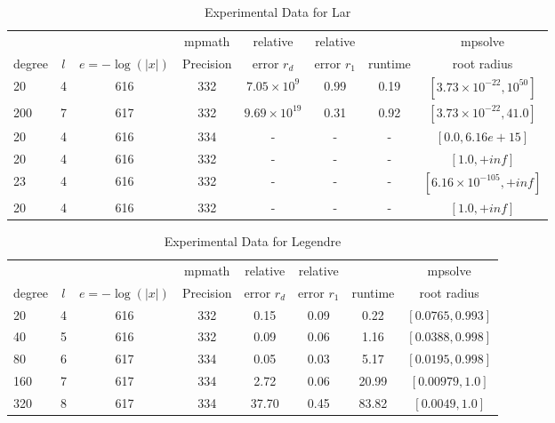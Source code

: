 \documentclass[sigconf]{acmart}
\begin{document}
\begin{table}[t]
\caption{Experimental Data for Lar}
\label{tab:lar}
\vskip -0.15in
\begin{center}
\begin{small}
\begin{sc}
\begin{tabular}{lccccccc}
\toprule
&  &  & mpmath & relative  & relative &  & mpsolve \\
degree  & $l$& $e=-\log(|x|)$& Precision &error $r_d$       & error $r_1$ &runtime& root radius\\
\midrule
   20  & 4 & 616 & 332 & $7.05 \times 10^9$ & 0.99 & 0.19 & $[3.73 \times 10^{-22}, 10^{50}]$ \\ %
  200 & 7 & 617 & 332 & $9.69 \times 10^{19}$ & 0.31 & 0.92 & $[3.73 \times 10^{-22}, 41.0]$\\ %
    20 & 4 & 616 & 334 & - & - & - & $[0.0, 6.16e+15]$\\ %
    20 & 4 & 616 & 332 & - & - & - & $[1.0, +inf]$\\ %
    23 & 4 & 616 & 332 & - & - & - & $[6.16\times 10^{-105}, +inf]$\\ %
    20 & 4 & 616 & 332 &- & - & - & $[1.0, +inf]$\\ %
\bottomrule
\end{tabular}
\end{sc}
\end{small}
\end{center}
\vskip 0.05in
\end{table}

\begin{table}[t]
\caption{Experimental Data for Legendre}
\label{tab:legendre}
\vskip -0.15in
\begin{center}
\begin{small}
\begin{sc}
\begin{tabular}{lccccccc}
\toprule
&  &  & mpmath & relative  & relative &  & mpsolve \\
degree  & $l$& $e=-\log(|x|)$& Precision &error $r_d$       & error $r_1$ &runtime& root radius\\
\midrule
   20 & 4 & 616 & 332 & 0.15 & 0.09 & 0.22 & $[0.0765,0.993]$ \\
   40 & 5 & 616 & 332 & 0.09 & 0.06 & 1.16 & $[0.0388,0.998]$\\
   80 & 6 & 617 & 334 & 0.05 & 0.03 & 5.17 & $[0.0195,0.998]$\\
 160 & 7 & 617 & 334 & 2.72 & 0.06 & 20.99 & $[0.00979,1.0]$\\
 320 & 8 & 617 & 334 & 37.70 & 0.45 & 83.82 & $[0.0049,1.0]$\\
\bottomrule
\end{tabular}
\end{sc}
\end{small}
\end{center}
\vskip 0.05in
\end{table}
\end{document}
